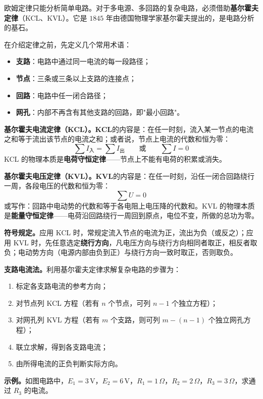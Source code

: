 \documentclass[12pt,UTF8]{ctexbook}
\begin{document}
欧姆定律只能分析简单电路。对于多电源、多回路的复杂电路，必须借助\textbf{基尔霍夫定律}（KCL、KVL）。它是 $1845$ 年由德国物理学家基尔霍夫提出的，是电路分析的基石。

在介绍定律之前，先定义几个常用术语：
\begin{itemize}
  \item \textbf{支路}：电路中通过同一电流的每一段路径；
  \item \textbf{节点}：三条或三条以上支路的连接点；
  \item \textbf{回路}：电路中任一闭合路径；
  \item \textbf{网孔}：内部不再含有其他支路的回路，即"最小回路"。
\end{itemize}

\textbf{基尔霍夫电流定律（KCL）。}\textbf{KCL}的内容是：在任一时刻，流入某一节点的电流之和等于流出该节点的电流之和；或者说，节点上电流的代数和恒为零：
\[
\sum I_{\text{入}} = \sum I_{\text{出}} \qquad \text{或} \qquad \sum I = 0
\]
KCL 的物理本质是\textbf{电荷守恒定律}——节点上不能有电荷的积累或消失。


\textbf{基尔霍夫电压定律（KVL）。}\textbf{KVL}的内容是：在任一时刻，沿任一闭合回路绕行一周，各段电压的代数和恒为零：
\[
\sum U = 0
\]
或写作：回路中电动势的代数和等于各电阻上电压降的代数和。KVL 的物理本质是\textbf{能量守恒定律}——电荷沿回路绕行一周回到原点，电位不变，所做的总功为零。

\textbf{符号规定。}应用 KCL 时，常规定流入节点的电流为正，流出为负（或反之）；应用 KVL 时，先任意选定\textbf{绕行方向}，凡电压方向与绕行方向相同者取正，相反者取负；电动势方向（电源内部由负到正）与绕行方向一致时取正，否则取负。

\textbf{支路电流法。}利用基尔霍夫定律求解复杂电路的步骤为：
\begin{enumerate}
  \item 标定各支路电流的参考方向；
  \item 对节点列 KCL 方程（若有 $n$ 个节点，可列 $n-1$ 个独立方程）；
  \item 对网孔列 KVL 方程（若有 $m$ 个支路，则可列 $m - (n-1)$ 个独立网孔方程）；
  \item 联立求解，得到各支路电流；
  \item 由所得电流的正负判断实际方向。
\end{enumerate}

\textbf{示例。}如图电路中，$E_1=3\,\mathrm{V}$，$E_2=6\,\mathrm{V}$，$R_1=1\,\Omega$，$R_2=2\,\Omega$，$R_3=3\,\Omega$，求通过 $R_3$ 的电流。
\end{document}
